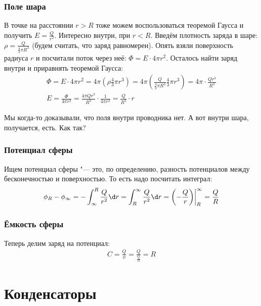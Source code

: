    \subsubsection{Поле шара}
      В точке на расстоянии $r>R$ тоже можем воспользоваться теоремой Гаусса и получить $E=\frac{Q}{r^2}$.
      Интересно внутри, при $r<R$.
      Введём плотность заряда в шаре: $\rho = \frac{Q}{\frac43\pi R^3}$ (будем считать, что заряд равномерен).
      Опять взяли поверхность радиуса $r$ и посчитали поток через неё: $\Phi = E \cdot 4\pi r^2$.
      Осталось найти заряд внутри и приравнять теоремой Гаусса:
      \begin{gather*}
      \Phi = E \cdot 4\pi r^2
      = 4\pi \left(\rho \frac43\pi r^3\right)
      = 4\pi \left(\frac{Q}{\frac 43\pi R^3} \frac43\pi r^3\right)
      = 4\pi \cdot \frac{Qr^3}{R^3} \\
      E
        = \frac{\Phi}{4\pi r^2} = \frac{4\pi Qr^3}{R^3} \cdot \frac{1}{4\pi r^2}
        = \frac{Q}{R^3} \cdot r
      \end{gather*}
      \begin{Exercise}
        Мы когда-то доказывали, что поля внутри проводника нет.
        А вот внутри шара, получается, есть.
        Как так?
      \end{Exercise}
    \subsubsection{Потенциал сферы}
      Ищем потенциал сферы "--- это, по определению, разность потенциалов между  бесконечностью и поверхностью.
      То есть надо посчитать интеграл:
      \begin{gather*}
      \phi_{R} - \phi_{\infty}
        = -\int_{\infty}^{R} \frac{Q}{r^2} \d r
        = \int_{R}^{\infty} \frac{Q}{r^2} \d r
        = \left(-\frac{Q}{r}\right)\biggr|_R^\infty
        = \frac{Q}{R}
      \end{gather*}
    \subsubsection{Ёмкость сферы}
      Теперь делим заряд на потенциал:
      \begin{gather*}
      C = \frac{Q}{\phi} = \frac{Q}{\frac QR} = R
      \end{gather*}

\section{Конденсаторы}
